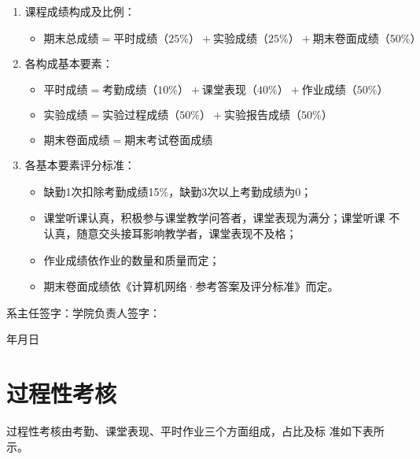 \documentclass{swfuassessment}
\begin{document}
\begin{enumerate}
\item 课程成绩构成及比例：
  \begin{itemize}
  \item \(期末总成绩 = 平时成绩（25\%）+ 实验成绩（25\%）+ 期末卷面成绩（50\%）\)
  \end{itemize}
\item 各构成基本要素：
  \begin{itemize}
  \item \(平时成绩 = 考勤成绩（10\%）+ 课堂表现（40\%）+ 作业成绩（50\%）\)
  \item \(实验成绩 = 实验过程成绩（50\%）+ 实验报告成绩（50\%）\)
  \item \(期末卷面成绩 = 期末考试卷面成绩\)
  \end{itemize}
\item 各基本要素评分标准：
  \begin{itemize}
  \item 缺勤1次扣除考勤成绩15\%，缺勤3次以上考勤成绩为0；
  \item 课堂听课认真，积极参与课堂教学问答者，课堂表现为满分；课堂听课
    不认真，随意交头接耳影响教学者，课堂表现不及格；
  \item 作业成绩依作业的数量和质量而定；
  \item 期末卷面成绩依《计算机网络·参考答案及评分标准》而定。
  \end{itemize}
\end{enumerate}
\vfill
\begin{flushright}
  系主任签字：\hspace{4cm}学院负责人签字：\hspace*{2cm}\par
  \bigskip
  \qquad{}年\qquad{}月\qquad{}日
\end{flushright}

\headtwo{}

\section{过程性考核}

过程性考核由考勤、课堂表现、平时作业三个方面组成，占比及标
准如下表所示。
\end{document}
